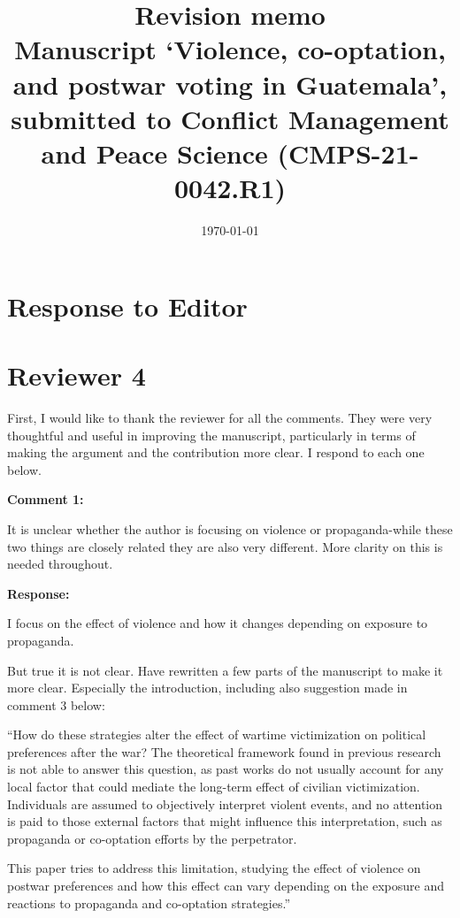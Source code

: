 \documentclass[12pt, a4paper, notitlepage]{article}
\title{\large \textbf{Revision memo}\\{\normalsize Manuscript `Violence, co-optation, and postwar voting in Guatemala', submitted to Conflict Management and Peace Science (CMPS-21-0042.R1)}}
\author{}
\date{\today}
\begin{document}
\maketitle

\section*{Response to Editor}

\newpage
\section*{Reviewer 4}

First, I would like to thank the reviewer for all the comments. They were very thoughtful and useful in improving the manuscript, particularly in terms of making the argument and the contribution more clear. I respond to each one below.

\vspace{15pt}
\noindent\textbf{Comment 1:}
\begin{displayquote}
It is unclear whether the author is focusing on violence or propaganda-while these two things are closely related they are also very different. More clarity on this is needed throughout.
\end{displayquote}

\noindent\textbf{Response:}

I focus on the effect of violence and how it changes depending on exposure to propaganda.

But true it is not clear. Have rewritten a few parts of the manuscript to make it more clear. Especially the introduction, including also suggestion made in comment 3 below:

``How do these strategies alter the effect of wartime victimization on political preferences after the war?
The theoretical framework found in previous research is not able to answer this question, as past works do not usually account for any local factor that could mediate the long-term effect of civilian victimization.
Individuals are assumed to objectively interpret violent events, and no attention is paid to those external factors that might influence this interpretation, such as propaganda or co-optation efforts by the perpetrator.

This paper tries to address this limitation, studying the effect of violence on postwar preferences and how this effect can vary depending on the exposure and reactions to propaganda and co-optation strategies.''
\end{document}
